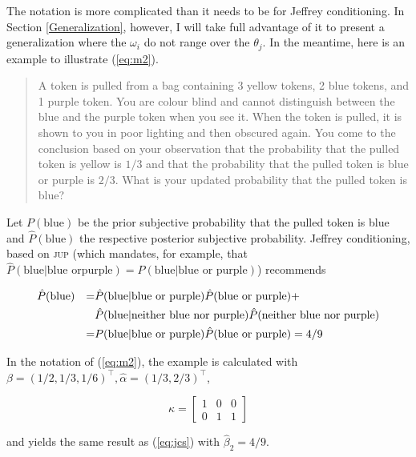 \documentclass[entropy,article,accept,oneauthor,pdftex,12pt,a4paper]{mdpi}
\newenvironment{quotex}{\begin{quote}\begin{footnotesize}}{\end{footnotesize}\end{quote}}
\begin{document}
{\noindent}The notation is more complicated than it needs to be for Jeffrey
conditioning. In Section \ref{Generalization}, however, I will take
full advantage of it to present a generalization where the
$\omega_{i}$ do not range over the $\theta_{j}$. In the meantime, here
is an example to illustrate (\ref{eq:m2}).

\begin{quotex}
  A token is pulled from a bag containing 3 yellow tokens, 2 blue
  tokens, and 1 purple token. You are colour blind and cannot
  distinguish between the blue and the purple token when you see it.
  When the token is pulled, it is shown to you in poor lighting and
  then obscured again. You come to the conclusion based on your
  observation that the probability that the pulled token is yellow is
  $1/3$ and that the probability that the pulled token is blue or
  purple is $2/3$. What is your updated probability that the pulled
  token is blue?
\end{quotex}

{\noindent}Let $P(\mbox{blue})$ be the prior subjective probability
that the pulled token is blue and $\hat{P}(\mbox{blue})$ the
respective posterior subjective probability. Jeffrey conditioning,
based on \textsc{jup} (which mandates, for example, that
$\hat{P}(\mbox{blue}|\mbox{blue or}\mbox{
  purple})=P(\mbox{blue}|\mbox{blue or purple})$) recommends

\begin{align}
  \label{eq:jcs}
&\hat{P}(\mbox{blue})&=&\hat{P}(\mbox{blue}|\mbox{blue or purple})\hat{P}(\mbox{blue or
  purple})+\notag \\
&&&\hat{P}(\mbox{blue}|\mbox{neither blue nor
  purple})\hat{P}(\mbox{neither blue nor purple})\notag \\
&&=&P(\mbox{blue}|\mbox{blue or purple})\hat{P}(\mbox{blue or
  purple})=4/9
\end{align}

{\noindent}In the notation of (\ref{eq:m2}), the example is calculated
with $\beta=(1/2,1/3,1/6)^{\top},\hat{\alpha}=(1/3,2/3)^{\top}$,

\begin{equation}
  \label{eq:kappa}
  \kappa=\left[
  \begin{array}{ccc}
    1 & 0 & 0 \\
    0 & 1 & 1
  \end{array}\right]
\end{equation}

{\noindent}and yields the same result as (\ref{eq:jcs}) with
$\hat{\beta}_{2}=4/9$.
\end{document}
